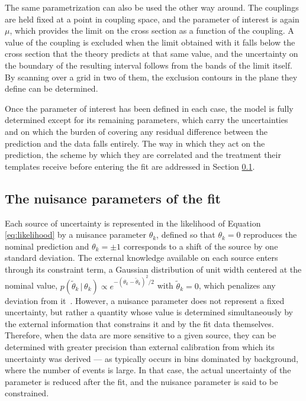 The same parametrization can also be used the other way around. The couplings are held fixed at a point in coupling space, and the parameter of interest is again $\mu$, which provides the limit on the cross section as a function of the coupling. A value of the coupling is excluded when the limit obtained with it falls below the cross section that the theory predicts at that same value, and the uncertainty on the boundary of the resulting interval follows from the bands of the limit itself. By scanning over a grid in two of them, the exclusion contours in the plane they define can be determined.\medskip


Once the parameter of interest has been defined in each case, the model is fully determined except for its remaining parameters, which carry the uncertainties and on which the burden of covering any residual difference between the prediction and the data falls entirely. The way in which they act on the prediction, the scheme by which they are correlated and the treatment their templates receive before entering the fit are addressed in Section \ref{subsec:bbtt_nuisances}.

\subsection{The nuisance parameters of the fit}
\label{subsec:bbtt_nuisances}
Each source of uncertainty is represented in the likelihood of Equation \ref{eq:likelihood} by a nuisance parameter $\theta_k$, defined so that $\theta_k = 0$ reproduces the nominal prediction and $\theta_k = \pm1$ corresponds to a shift of the source by one standard deviation. The external knowledge available on each source enters through its constraint term, a Gaussian distribution of unit width centered at the nominal value, $p(\tilde{\theta}_k\,|\,\theta_k) \propto e^{-(\theta_k-\tilde{\theta}_k)^2/2}$ with $\tilde{\theta}_k = 0$, which penalizes any deviation from it~\cite{CMS-combine}. However, a nuisance parameter does not represent a fixed uncertainty, but rather a quantity whose value is determined simultaneously by the external information that constrains it and by the fit data themselves. Therefore, when the data are more sensitive to a given source, they can be determined with greater precision than external calibration from which its uncertainty was derived — as typically occurs in bins dominated by background, where the number of events is large. In that case, the actual uncertainty of the parameter is reduced after the fit, and the nuisance parameter is said to be constrained. 

